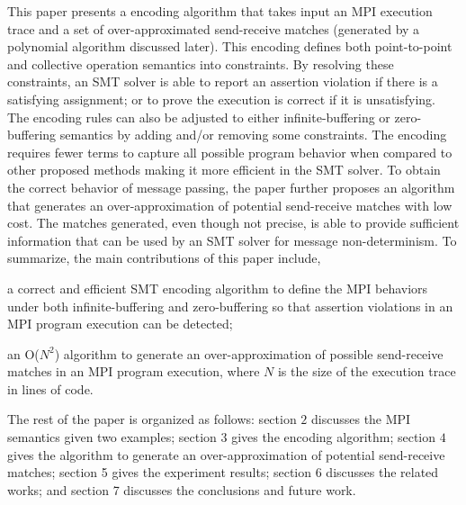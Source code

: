 This paper presents a encoding algorithm that takes input an MPI execution trace and a set of over-approximated send-receive matches (generated by a polynomial algorithm discussed later). This encoding defines both point-to-point and collective operation semantics into constraints. By resolving these constraints, an SMT solver is able to report an assertion violation if there is a satisfying assignment; or to prove the execution is correct if it is unsatisfying.  The encoding rules can also be adjusted to either infinite-buffering or zero-buffering semantics by adding and/or removing some constraints. The encoding requires fewer terms to capture all possible program behavior when compared to other proposed methods making it more efficient in the SMT solver. To obtain the correct behavior of message passing, the paper further proposes an algorithm that generates an over-approximation of potential send-receive matches with low cost. The matches generated, even though not precise, is able to provide sufficient information that can be used by an SMT solver for message non-determinism. To summarize, the main contributions of this paper include,
\begin{compactenum}
\item a correct and efficient SMT encoding algorithm to define the MPI behaviors under both infinite-buffering and zero-buffering so that assertion violations in an MPI program execution can be detected;
\item an O($N^2$) algorithm to generate an over-approximation of possible send-receive matches in an MPI program execution, where $N$ is the size of the execution trace in lines of code. 
\end{compactenum}

The rest of the paper is organized as follows: section $2$ discusses the MPI semantics given two examples; section $3$ gives the encoding algorithm; section $4$ gives the algorithm to generate an over-approximation of potential send-receive matches; section 5 gives the experiment results; section 6 discusses the related works; and section 7 discusses the conclusions and future work.

\examplefigone


           